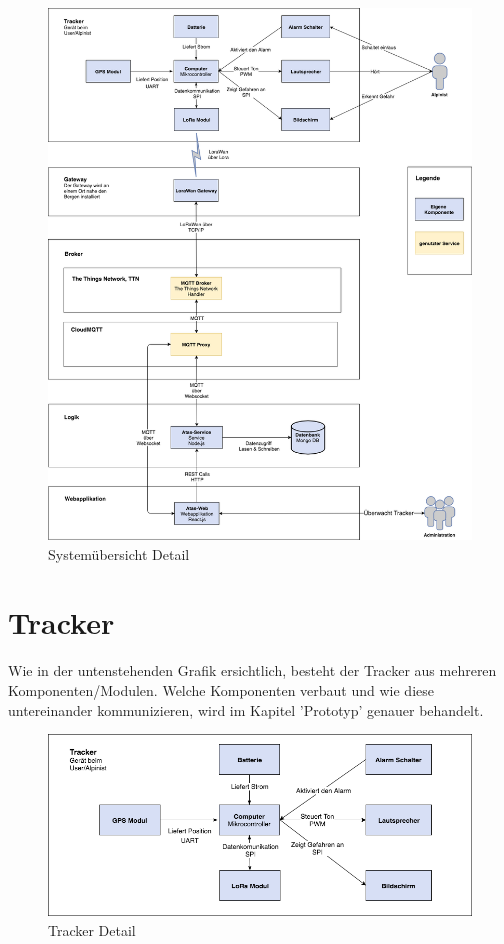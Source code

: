 \documentclass[11pt,english,german]{report}
\theoremstyle{definition}
\begin{document}
\newpage
\begin{figure}[H]
	\centering
	\includegraphics[width=\textwidth]{img/system/ATAS_SystemOverview_Detail_BA.png}
	\caption[Systemübersicht Detail]
	{Systemübersicht Detail}
\end{figure}
\newpage

\section{Tracker}
Wie in der untenstehenden Grafik ersichtlich, besteht der Tracker aus mehreren Komponenten/Modulen. Welche Komponenten verbaut und wie diese untereinander kommunizieren, wird im Kapitel 'Prototyp' genauer behandelt.
\begin{figure}[H]
	\centering
	\includegraphics[width=\textwidth]{img/system/ATAS_SystemOverview_Tracker_BA.png}
	\caption[Tracker Detail]
	{Tracker Detail}
\end{figure}
\end{document}
